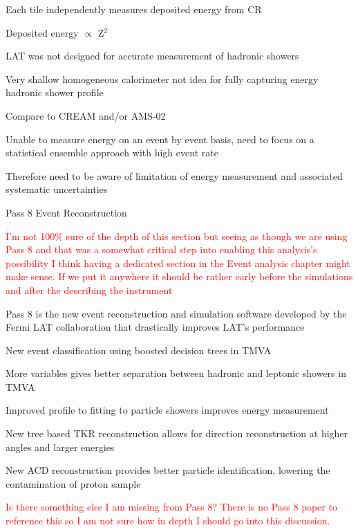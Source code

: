 \documentclass{article}
\begin{document}
\begin{myEnumerate}
\begin{myEnumerate}
\begin{myEnumerate}
					\item Each tile independently measures deposited energy from CR
					\item Deposited energy $\propto$ Z$^2$ 
				\end{myEnumerate}
				\item LAT was not designed for accurate measurement of hadronic showers
				\begin{myEnumerate}
					\item Very shallow homogeneous calorimeter not idea for fully capturing energy hadronic shower profile
					\item Compare to CREAM and/or AMS-02 
					\item Unable to measure energy on an event by event basis, need to focus on a statistical ensemble approach with high event rate
					\item Therefore need to be aware of limitation of energy measurement and associated systematic uncertainties
				\end{myEnumerate}
			\end{myEnumerate}
		\item Pass 8 Event Reconstruction 
			\begin{myEnumerate}
				\item \textcolor{red}{I'm not 100\% sure of the depth of this section but seeing as though we are using Pass 8 and that was a somewhat critical step into enabling this analysis's possibility I think having a dedicated section in the Event analysis chapter might make sense.  If we put it anywhere it should be rather early before the simulations and after the describing the instrument}
				\item Pass 8 is the new event reconstruction and simulation software developed by the Fermi LAT collaboration that drastically improves LAT's performance
				\item New event classification using boosted decision trees in TMVA
				\item More variables gives better separation between hadronic and leptonic showers in TMVA
				\item Improved profile to fitting to particle showers improves energy measurement
				\item New tree based TKR reconstruction allows for direction reconstruction at higher angles and larger energies
				\item New ACD reconstruction provides better particle identification, lowering the contamination of proton sample
				\item \textcolor{red}{Is there something else I am missing from Pass 8?  There is no Pass 8 paper to reference this so I am not sure how in depth I should go into this discussion.}

\end{myEnumerate}
\end{myEnumerate}
\end{document}
